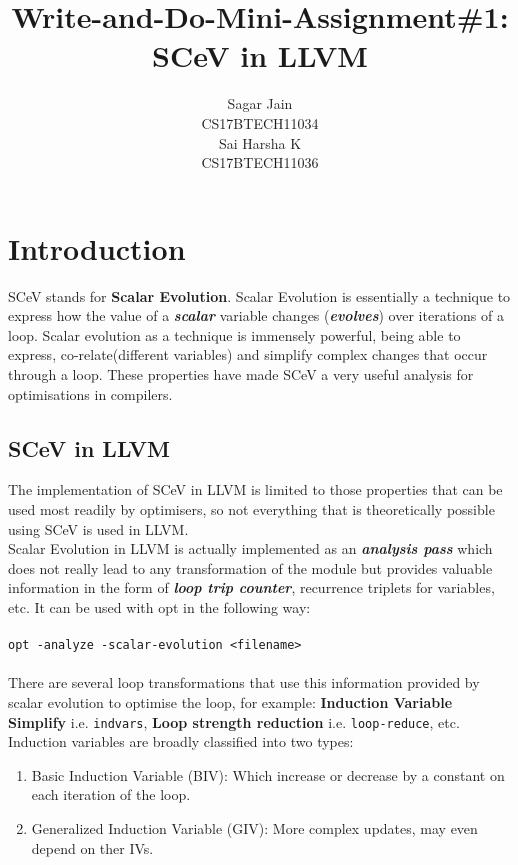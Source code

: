 \documentclass[12pt]{article}
\begin{document}
\title{Write-and-Do-Mini-Assignment\#1: SCeV in LLVM}
\author{Sagar Jain\\CS17BTECH11034\\Sai Harsha K\\CS17BTECH11036}
\maketitle

\section*{Introduction}
SCeV stands for \textbf{Scalar Evolution}. Scalar Evolution is essentially a technique to express how the value of a  \textbf{\textit{scalar}} variable changes (\textbf{\textit{evolves}}) over iterations of a loop. Scalar evolution as a technique is immensely powerful, being able to express, co-relate(different variables) and simplify complex changes that occur through a loop. These properties have made SCeV a very useful analysis for optimisations in compilers.
\subsection*{SCeV in LLVM}
The implementation of SCeV in LLVM is limited to those properties that can be used most readily by optimisers, so not everything that is theoretically possible using SCeV is used in LLVM.\\
Scalar Evolution in LLVM is actually implemented as an \textit{\textbf{analysis pass}} which does not really lead to any transformation of the module but provides valuable information in the form of \textbf{\textit{loop trip counter}}, {recurrence triplets} for variables, etc. It can be used with opt in the following way:\\\\
\texttt{opt -analyze -scalar-evolution <filename>}\\\\
There are several loop transformations that use this information provided by scalar evolution to optimise the loop, for example: \textbf{Induction Variable Simplify} i.e. \texttt{indvars}, \textbf{Loop strength reduction} i.e. \texttt{loop-reduce}, etc.\\

Induction variables are broadly classified into two types:\\
\begin{enumerate}
\item Basic Induction Variable (BIV): Which increase or decrease by a constant on each iteration of the loop.
\item Generalized Induction Variable (GIV): More complex updates, may even depend on ther IVs.
\end{enumerate}
\end{document}
